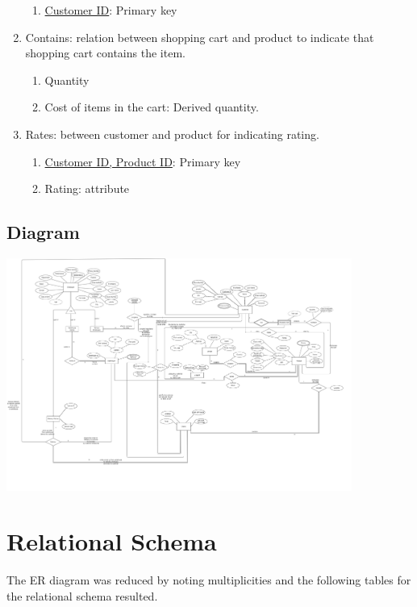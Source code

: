 \documentclass[12pt]{report}
\begin{document}
\begin{enumerate}
			\begin{enumerate}
				\item \underline{Customer ID}: Primary key
			\end{enumerate}
	\item Contains: relation between shopping cart and product to indicate that shopping cart contains the item.
		\begin{enumerate}
			\item Quantity
			\item Cost of items in the cart: Derived quantity.
		\end{enumerate}
	\item Rates: between customer and product for indicating rating.
		\begin{enumerate}
			\item \underline{Customer ID, Product ID}: Primary key
			\item Rating: attribute
		\end{enumerate}
	\end{enumerate}


	\section{Diagram}
	\includegraphics[width =0.85\textwidth]{Pictures/ER_Diagram.png}

\chapter{Relational Schema}
The ER diagram was reduced by noting multiplicities and the following tables for the relational schema resulted.
\end{document}
